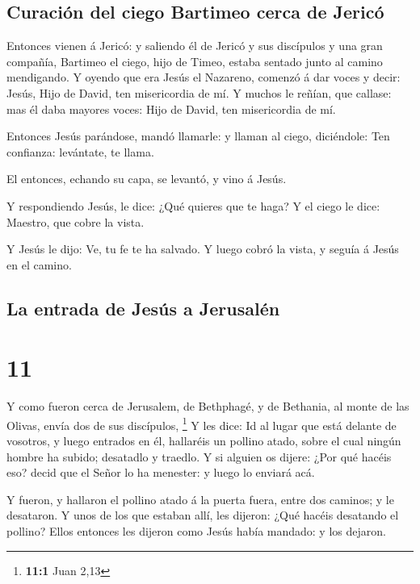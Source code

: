 \hypertarget{curaciuxf3n-del-ciego-bartimeo-cerca-de-jericuxf3}{%
\subsection{Curación del ciego Bartimeo cerca de
Jericó}\label{curaciuxf3n-del-ciego-bartimeo-cerca-de-jericuxf3}}

 Entonces vienen á Jericó: y saliendo él de Jericó y sus
discípulos y una gran compañía, Bartimeo el ciego, hijo de Timeo, estaba
sentado junto al camino mendigando.  Y oyendo que era Jesús
el Nazareno, comenzó á dar voces y decir: Jesús, Hijo de David, ten
misericordia de mí.  Y muchos le reñían, que callase: mas
él daba mayores voces: Hijo de David, ten misericordia de mí.

 Entonces Jesús parándose, mandó llamarle: y llaman al
ciego, diciéndole: Ten confianza: levántate, te llama.

 El entonces, echando su capa, se levantó, y vino á Jesús.

 Y respondiendo Jesús, le dice: ¿Qué quieres que te haga? Y
el ciego le dice: Maestro, que cobre la vista.

 Y Jesús le dijo: Ve, tu fe te ha salvado. Y luego cobró la
vista, y seguía á Jesús en el camino.

\hypertarget{la-entrada-de-jesuxfas-a-jerusaluxe9n}{%
\subsection{La entrada de Jesús a
Jerusalén}\label{la-entrada-de-jesuxfas-a-jerusaluxe9n}}

\hypertarget{section-10}{%
\section{11}\label{section-10}}

 Y como fueron cerca de Jerusalem, de Bethphagé, y de
Bethania, al monte de las Olivas, envía dos de sus discípulos,
\footnote{\textbf{11:1} Juan 2,13}  Y les dice: Id al lugar
que está delante de vosotros, y luego entrados en él, hallaréis un
pollino atado, sobre el cual ningún hombre ha subido; desatadlo y
traedlo.  Y si alguien os dijere: ¿Por qué hacéis eso? decid
que el Señor lo ha menester: y luego lo enviará acá.

 Y fueron, y hallaron el pollino atado á la puerta fuera,
entre dos caminos; y le desataron.  Y unos de los que
estaban allí, les dijeron: ¿Qué hacéis desatando el pollino?
 Ellos entonces les dijeron como Jesús había mandado: y los
dejaron.

